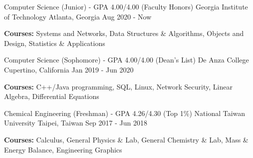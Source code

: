

\begin{cventries}

  \cventry
    {Computer Science (Junior) - GPA 4.00/4.00 (Faculty Honors)} %
    {Georgia Institute of Technology} %
    {Atlanta, Georgia} %
    {Aug 2020 - Now} %
   {
		\vspace{-5.0mm}
		\item {\textbf{Courses:} Systems and Networks, Data Structures \& Algorithms, Objects and Design, Statistics \& Applications} 
   }

  \cventry
    {Computer Science (Sophomore) - GPA 4.00/4.00 (Dean's List)} %
    {De Anza College} %
    {Cupertino, California} %
    {Jan 2019 - Jun 2020} %
   {
		\vspace{-5.0mm}
		\item {\textbf{Courses:} C++/Java programming, SQL, Linux, Network Security, Linear Algebra, Differential Equations}
   }

  \cventry
    {Chemical Engineering (Freshman) - GPA 4.26/4.30 (Top 1\%)} %
    {National Taiwan University} %
    {Taipei, Taiwan} %
    {Sep 2017 - Jun 2018} %
    {
		\vspace{-5.0mm}
		\item {\textbf{Courses:} Calculus, General Physics \& Lab, General Chemistry \& Lab, Mass \& Energy Balance, Engineering Graphics}
	}

\end{cventries}
